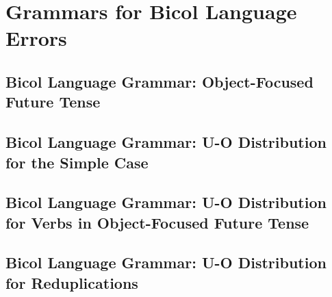 \section{Grammars for Bicol Language Errors}
\subsection{Bicol Language Grammar: Object-Focused Future Tense}
\subsection{Bicol Language Grammar: U-O Distribution for the Simple Case}
\subsection{Bicol Language Grammar: U-O Distribution for Verbs in Object-Focused Future Tense}
\subsection{Bicol Language Grammar: U-O Distribution for Reduplications}
